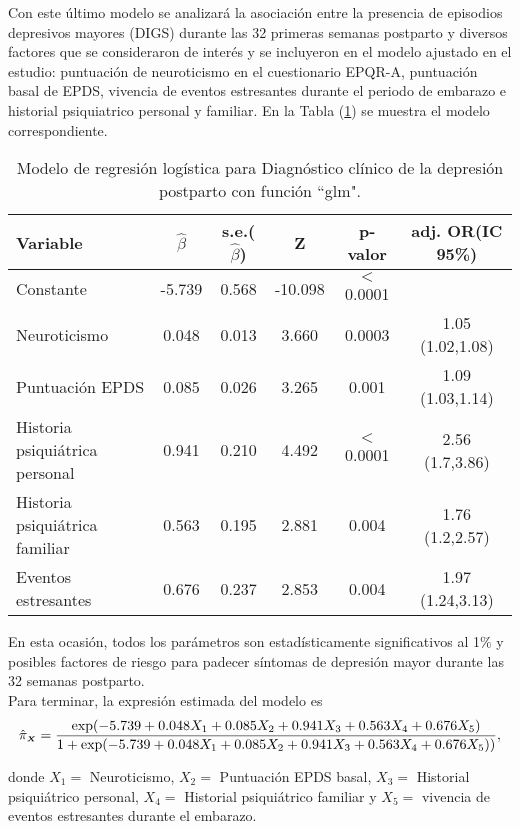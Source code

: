 Con este último modelo se analizará la asociación entre la presencia de episodios depresivos mayores (DIGS) durante las 32 primeras semanas postparto y diversos factores que se consideraron de interés y se incluyeron en el modelo ajustado en el estudio: puntuación de neuroticismo en el cuestionario EPQR-A, puntuación basal de EPDS, vivencia de eventos estresantes durante el periodo de embarazo e historial psiquiatrico personal y familiar. En la Tabla (\ref{tab:9}) se muestra el modelo correspondiente.

\begin{table} [H]
	\centering
	\begin{tabular}{l c c c c c}
		\toprule
		\textbf{Variable} & $\hat{\beta}$ & s.e.($\hat{\beta}$) & Z & p-valor & adj. OR(IC 95\%)\\
		\midrule
		Constante &  -5.739  & 0.568 &-10.098 & $<$ 0.0001 &  \\
		Neuroticismo &  0.048 &   0.013  & 3.660 &0.0003   & 1.05 (1.02,1.08) \\
		Puntuación EPDS &  0.085   & 0.026  &3.265 &0.001  & 1.09 (1.03,1.14) \\
		Historia psiquiátrica personal &   0.941  &  0.210  & 4.492& $<$ 0.0001  &2.56 (1.7,3.86) \\
		Historia psiquiátrica familiar & 0.563  &  0.195 & 2.881 &0.004 & 1.76 (1.2,2.57)\\
		Eventos estresantes&  0.676 &  0.237  &  2.853& 0.004 & 1.97 (1.24,3.13)\\
		\bottomrule
	\end{tabular}
	\caption{Modelo de regresión logística para Diagnóstico clínico de la depresión postparto con función ``glm".}
	\label{tab:9}
\end{table}

En esta ocasión, todos los parámetros son estadísticamente significativos al 1\% y posibles factores de riesgo para padecer síntomas de depresión mayor durante las 32 semanas postparto. \\

Para terminar, la expresión estimada del modelo es
\begin{equation*}
\hat{\pi}_{\mathsmaller{\boldsymbol{X}}}=\frac{\exp(-5.739+0.048X_1+0.085X_2+0.941X_3+0.563X_4+0.676X_5)}{1+\exp(-5.739+0.048X_1+0.085X_2+0.941X_3+0.563X_4+0.676X_5))},
\end{equation*}

donde $X_1=$ Neuroticismo, $X_2=$ Puntuación EPDS basal, $X_3=$ Historial psiquiátrico personal, $X_4=$ Historial psiquiátrico familiar y $X_5=$ vivencia de eventos estresantes durante el embarazo.\\



